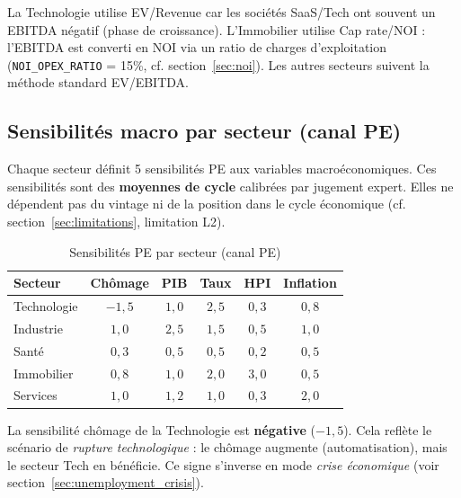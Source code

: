 \documentclass[12pt,a4paper]{article}
\begin{document}
\begin{interpretbox}
La Technologie utilise EV/Revenue car les soci\'{e}t\'{e}s SaaS/Tech ont souvent un EBITDA n\'{e}gatif
(phase de croissance). L'Immobilier utilise Cap rate/NOI : l'EBITDA est converti en NOI
via un ratio de charges d'exploitation (\texttt{NOI\_OPEX\_RATIO} = 15\%, cf. section~\ref{sec:noi}).
Les autres secteurs suivent la m\'{e}thode standard EV/EBITDA.
\end{interpretbox}

\subsection{Sensibilit\'{e}s macro par secteur (canal PE)}

Chaque secteur d\'{e}finit 5 sensibilit\'{e}s PE aux variables macro\'{e}conomiques.
Ces sensibilit\'{e}s sont des \textbf{moyennes de cycle} calibr\'{e}es par jugement expert.
Elles ne d\'{e}pendent pas du vintage ni de la position dans le cycle \'{e}conomique
(cf. section~\ref{sec:limitations}, limitation L2).

\begin{table}[h]
\centering
\caption{Sensibilit\'{e}s PE par secteur (canal PE)}
\label{tab:sensitivities}
\begin{tabular}{lccccc}
\toprule
\textbf{Secteur} & \textbf{Ch\^{o}mage} & \textbf{PIB} & \textbf{Taux} & \textbf{HPI} & \textbf{Inflation} \\
\midrule
Technologie & $-1{,}5$ & $1{,}0$ & $2{,}5$ & $0{,}3$ & $0{,}8$ \\
Industrie   & $1{,}0$  & $2{,}5$ & $1{,}5$ & $0{,}5$ & $1{,}0$ \\
Sant\'{e}      & $0{,}3$  & $0{,}5$ & $0{,}5$ & $0{,}2$ & $0{,}5$ \\
Immobilier  & $0{,}8$  & $1{,}0$ & $2{,}0$ & $3{,}0$ & $0{,}5$ \\
Services    & $1{,}0$  & $1{,}2$ & $1{,}0$ & $0{,}3$ & $2{,}0$ \\
\bottomrule
\end{tabular}
\end{table}

\begin{warningbox}
La sensibilit\'{e} ch\^{o}mage de la Technologie est \textbf{n\'{e}gative} ($-1{,}5$). Cela refl\`{e}te
le sc\'{e}nario de \textit{rupture technologique} : le ch\^{o}mage augmente (automatisation),
mais le secteur Tech en b\'{e}n\'{e}ficie. Ce signe s'inverse en mode \textit{crise \'{e}conomique}
(voir section~\ref{sec:unemployment_crisis}).
\end{warningbox}
\end{document}
